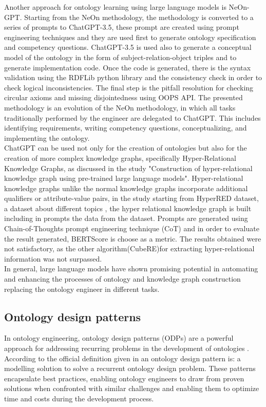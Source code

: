 Another approach for ontology learning using large language models is NeOn-GPT.\cite{fathallah2024neon} Starting from the NeOn methodology, the methodology is converted to a series of prompts to ChatGPT-3.5, these prompt are created using prompt engineering techniques and they are used first to generate ontology specification and competency questions. ChatGPT-3.5 is used also to generate a conceptual model of the ontology in the form of subject-relation-object triples and to generate implementation code. Once the code is generated, there is the syntax validation using the RDFLib python library\cite{rdflib} and the consistency check in order to check logical inconsistencies. The final step is the pitfall resolution for checking circular axioms and missing disjointedness using OOPS API. The presented methodology is an evolution of the NeOn methodology, in which all tasks traditionally performed by the engineer are delegated to ChatGPT. This includes identifying requirements, writing competency questions, conceptualizing, and implementing the ontology.\\
ChatGPT can be used not only for the creation of ontologies but also for the creation of more complex knowledge graphs, specifically Hyper-Relational Knowledge Graphs, as discussed in the study "Construction of hyper-relational knowledge graph using pre-trained large language models".\cite{datta2024construction} Hyper-relational knowledge graphs unlike the normal knowledge graphs incorporate additional qualifiers or attribute-value pairs\cite{hyper}, in the study starting from HyperRED dataset, a dataset about different topics , the hyper relational knowledge graph is built including in prompts the data from the dataset. Prompts are generated using Chain-of-Thoughts prompt engineering technique (CoT) and in order to evaluate the result generated, BERTScore is choose as a metric. The results obtained were not satisfactory, as the other algorithm(CubeRE)for extracting hyper-relational information was not surpassed.\\
In general, large language models have shown promising potential  in automating and enhancing the processes of ontology and knowledge graph construction replacing the ontology engineer in different tasks.

\newpage
\subsection{Ontology design patterns}
\label{subsection:2_2_ontology_design_patterns}
In ontology engineering, ontology design patterns (ODPs)\cite{odps} are a powerful approach for addressing recurring problems in the development of ontologies \cite{hitzler2016ontology}.
According to the official definition given in \cite{gangemi2009ontology} an ontology design pattern is: a modelling solution to solve a recurrent ontology design problem.
These patterns encapsulate best practices, enabling ontology engineers to draw from proven solutions when confronted with similar challenges and enabling them to optimize time and costs during the development process. 

